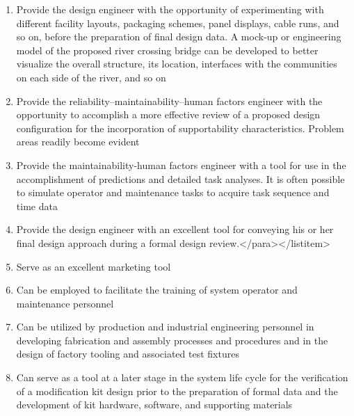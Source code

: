 \begin{enumerate}
	\item Provide the design engineer with the opportunity of experimenting with different facility layouts, packaging schemes, panel displays, cable runs, and so on, before the preparation of final design data. A mock-up or engineering model of the proposed river crossing bridge can be developed to better visualize the overall structure, its location, interfaces with the communities on each side of the river, and so on
	\item Provide the reliability–maintainability–human factors engineer with the opportunity to accomplish a more effective review of a proposed design configuration for the incorporation of supportability characteristics. Problem areas readily become evident
	\item Provide the maintainability-human factors engineer with a tool for use in the accomplishment of predictions and detailed task analyses. It is often possible to simulate operator and maintenance tasks to acquire task sequence and time data
	\item Provide the design engineer with an excellent tool for conveying his or her final design approach during a formal design review.</para></listitem>
	\item Serve as an excellent marketing tool
	\item Can be employed to facilitate the training of system operator and maintenance personnel
	\item Can be utilized by production and industrial engineering personnel in developing fabrication and assembly processes and procedures and in the design of factory tooling and associated test fixtures
	\item Can serve as a tool at a later stage in the system life cycle for the verification of a modification kit design prior to the preparation of formal data and the development of kit hardware, software, and supporting materials
\end{enumerate}